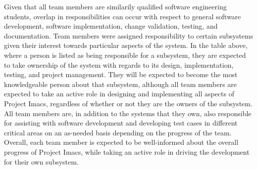 \documentclass{article}
\begin{document}
Given that all team members are similarily qualified software engineering students, overlap in responsibilities can occur with respect to general software development, software implementation, change validation, testing, and documentation. Team members were assigned responsibility to certain subsystems given their interest towards particular aspects of the system. In the table above, where a person is listed as being responsible for a subsystem, they are expected to take ownership of the system with regards to its design, implementation, testing, and project management. They will be expected to become the most knowledgeable person about that subsystem, although all team members are expected to take an active role in designing and implementing all aspects of Project Imacs, regardless of whether or not they are the owners of the subsystem. All team members are, in addition to the systems that they own, also responsible for assisting with software development and developing test cases in different critical areas on an as-needed basis depending on the progress of the team. Overall, each team member is expected to be well-informed about the overall progress of Project Imacs, while taking an active role in driving the development for their own subsystem.
\end{document}
